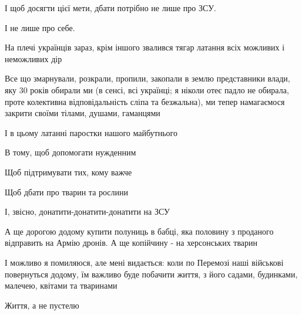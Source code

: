 І щоб досягти цієї мети, дбати потрібно не лише про ЗСУ. 

І не лише про себе. 

На плечі українців зараз, крім іншого звалився тягар латання всіх можливих і
неможливих дір

Все що змарнували, розкрали, пропили, закопали в землю представники влади, яку
30 років обирали ми (в сенсі, всі українці; я ніколи отеє падло не обирала,
проте колективна відповідальність сліпа та безжальна), ми тепер намагаємося
закрити  своїми тілами, душами, гаманцями 

І в цьому латанні паростки нашого майбутнього

В тому, щоб допомогати нужденним

Щоб підтримувати тих, кому важче

Щоб дбати про тварин та рослини

І, звісно, донатити-донатити-донатити на ЗСУ

А ще дорогою додому купити полуниць в бабці, яка половину з проданого
відправить на Армію дронів. А ще копійчину - на херсонських тварин

І можливо я помиляюся, але мені видається: коли по Перемозі наші військові
повернуться додому, їм важливо буде побачити життя, з його садами, будинками,
малечею, квітами та тваринами

Життя, а не пустелю

